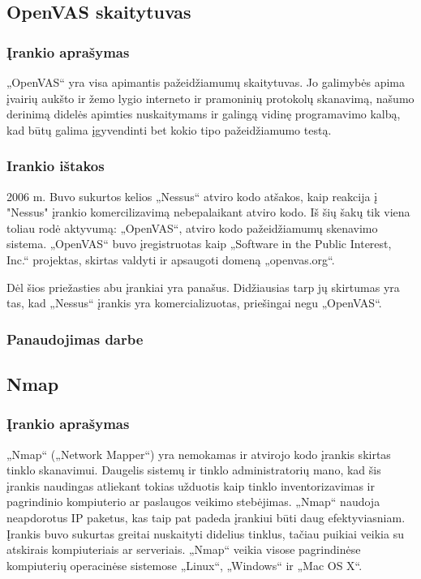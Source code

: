 \documentclass[a4paper,12pt,fleqn]{article}
\begin{document}
\subsection{OpenVAS skaitytuvas}
\label{sec:example}

\subsubsection{Įrankio aprašymas}

„OpenVAS“ yra visa apimantis pažeidžiamumų skaitytuvas. Jo galimybės apima įvairių aukšto ir žemo lygio interneto ir pramoninių protokolų skanavimą, našumo derinimą didelės apimties nuskaitymams ir galingą vidinę programavimo kalbą, kad būtų galima įgyvendinti bet kokio tipo pažeidžiamumo testą.

\subsubsection{Irankio ištakos}


2006 m. Buvo sukurtos kelios „Nessus“ atviro kodo atšakos, kaip reakcija į "Nessus" įrankio komercilizavimą nebepalaikant atviro kodo. Iš šių šakų tik viena toliau rodė aktyvumą: „OpenVAS“, atviro kodo pažeidžiamumų skenavimo sistema. „OpenVAS“ buvo įregistruotas kaip „Software in the Public Interest, Inc.“ projektas, skirtas valdyti ir apsaugoti domeną „openvas.org“.

Dėl šios priežasties abu įrankiai yra panašus. Didžiausias tarp jų skirtumas yra tas, kad „Nessus“ įrankis yra komercializuotas, priešingai negu „OpenVAS“.

\subsubsection{Panaudojimas darbe}

\subsection{Nmap}
\label{sec:nmap}

\subsubsection{Įrankio aprašymas}

„Nmap“ („Network Mapper“) yra nemokamas ir atvirojo kodo įrankis skirtas tinklo skanavimui. Daugelis sistemų ir tinklo administratorių mano, kad šis įrankis naudingas atliekant tokias užduotis kaip tinklo inventorizavimas ir  pagrindinio kompiuterio ar paslaugos veikimo stebėjimas. „Nmap“ naudoja neapdorotus IP paketus, kas taip pat padeda įrankiui būti daug efektyviasniam. Įrankis buvo sukurtas greitai nuskaityti didelius tinklus, tačiau puikiai veikia su atskirais kompiuteriais ar serveriais. „Nmap“ veikia visose pagrindinėse kompiuterių operacinėse sistemose  „Linux“, „Windows“ ir „Mac OS X“. \cite{Orebaugh:2008:NEY:1571843}
\end{document}
